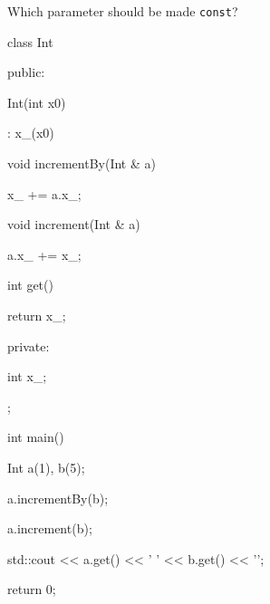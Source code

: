 Which parameter should be made \texttt{const}?



\begin{consolethree}[escapeinside=||]

class Int

{

public:

    Int(int x0)

        : x_(x0)

    {}

    void incrementBy(Int & a)

    {

        x_ += a.x_;

    }

    void increment(Int & a)

    {

        a.x_ += x_;

    }

    int get()

    {

        return x_;

    }

private:

    int x_;

};



int main()

{

    Int a(1), b(5);

    a.incrementBy(b);

    a.increment(b);

    std::cout << a.get() << ' ' << b.get() << '\n';

    return 0;

}

\end{consolethree}

